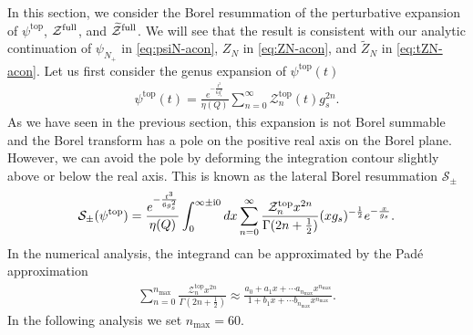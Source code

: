 \documentclass[11pt]{article}
\newcommand{\ri}{{\rm i}}
\newcommand{\hf}{\frac{1}{2}}
\def\til#1{\widetilde{#1}}
\def\Ga{\Gamma}
\newcommand{\Ztop}{\mathcal{Z}^{\text{top}}}
\renewcommand{\[}{\begin{eqnarray}}
\renewcommand{\]}{\end{eqnarray}}
\newcommand{\Zefull}{{\cal Z}^{\text{full}}}
\newcommand{\Zofull}{{\widetilde{\cal Z}}^{\text{full}}}
\begin{document}
In this section, we consider the 
Borel resummation of the perturbative expansion of
$\psi^{\text{top}}$, $\Zefull$, and $\Zofull$.
We will see that the result is consistent with
our analytic continuation of
$\psi_{N_+}$ in \eqref{eq:psiN-acon},
$Z_N$ in \eqref{eq:ZN-acon}, and $\til{Z}_N$ in \eqref{eq:tZN-acon}.
Let us first consider the genus expansion of
$\psi^{\text{top}}(t)$
%
\begin{align}
\psi^{\text{top}}(t)
=\frac{e^{-\frac{t^3}{6g_s^2}}}{\eta(Q)}
 \sum_{n=0}^\infty \Ztop_n(t)g_s^{2n}.
\end{align}
%
As we have seen in the previous section, 
this expansion is not Borel summable and the Borel transform
has a pole on the positive real axis on the Borel plane.
However, we can avoid the pole by deforming the integration
contour slightly above or below the real axis.
This is known as the lateral Borel resummation $\mathcal{S}_{\pm}$
%
\begin{align}
 \mathcal{S}_{\pm}(\psi^{\text{top}})
=\frac{e^{-\frac{t^3}{6g_s^2}}}{\eta(Q)}\int_0^{\infty\pm\ri 0}
 dx \sum_{n=0}^\infty \frac{\Ztop_nx^{2n}}{\Ga(2n+\hf)}(xg_s)^{-\hf}
 e^{-\frac{x}{g_s}}.
\end{align}
%
In the numerical analysis, 
the integrand can be approximated by the Pad\'{e} approximation 
\begin{align}
 \sum_{n=0}^{n_{\text{max}}} \frac{\Ztop_nx^{2n}}{\Ga(2n+\hf)}\approx \frac{a_0+a_1x+\cdots 
a_{n_{\text{max}}}x^{n_{\text{max}}}}{1+b_1x+\cdots 
b_{n_{\text{max}}}x^{n_{\text{max}}}}.
\label{eq:Pade}
\end{align}
In the following analysis we set $n_{\text{max}}=60$.
\end{document}
